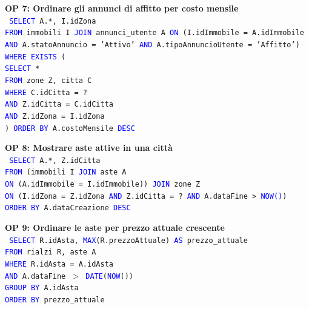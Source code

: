 \documentclass[a4paper,12pt]{report}
\begin{document}
            \newpage
            \noindent
            \textbf{OP 7: Ordinare gli annunci di affitto per costo mensile} \\
            \texttt{
                \textcolor{blue}{SELECT} A.*, I.idZona \\
                \textcolor{blue}{FROM} immobili I \textcolor{blue}{JOIN} annunci\_utente A \textcolor{blue}{ON} (I.idImmobile = A.idImmobile \textcolor{blue}{AND} A.statoAnnuncio = 'Attivo' \textcolor{blue}{AND} A.tipoAnnuncioUtente = 'Affitto') \\
                \textcolor{blue}{WHERE EXISTS} (\\
                    \null\qquad \textcolor{blue}{SELECT} * \\
                    \null\qquad \textcolor{blue}{FROM} zone Z, citta C \\
                    \null\qquad \textcolor{blue}{WHERE} C.idCitta = ? \\
                    \null\qquad \textcolor{blue}{AND} Z.idCitta = C.idCitta \\
                    \null\qquad \textcolor{blue}{AND} Z.idZona = I.idZona\\
                    ) \textcolor{blue}{ORDER BY} A.costoMensile \textcolor{blue}{DESC} \\
            }
            
            \noindent
            \textbf{OP 8: Mostrare aste attive in una città} \\
            \texttt{
                \textcolor{blue}{SELECT} A.*, Z.idCitta \\
                \textcolor{blue}{FROM} (immobili I \textcolor{blue}{JOIN} aste A \\ 
                \textcolor{blue}{ON} (A.idImmobile = I.idImmobile)) \textcolor{blue}{JOIN} zone Z \\ 
                \textcolor{blue}{ON} (I.idZona = Z.idZona \textcolor{blue}{AND} Z.idCitta = ? \textcolor{blue}{AND} A.dataFine > \textcolor{blue}{NOW()}) \\
                \textcolor{blue}{ORDER BY} A.dataCreazione  \textcolor{blue}{DESC} \\
            }
            
            \noindent
            \textbf{OP 9: Ordinare le aste per prezzo attuale crescente} \\
            \texttt{
                \textcolor{blue}{SELECT} R.idAsta, \textcolor{blue}{MAX}(R.prezzoAttuale) \textcolor{blue}{AS} prezzo\_attuale \\
                \textcolor{blue}{FROM} rialzi R, aste A \\
                \textcolor{blue}{WHERE} R.idAsta = A.idAsta \\
                \textcolor{blue}{AND} A.dataFine $>$ \textcolor{blue}{DATE}(\textcolor{blue}{NOW}()) \\
                \textcolor{blue}{GROUP BY} A.idAsta \\
                \textcolor{blue}{ORDER BY} prezzo\_attuale \\
            }
\end{document}
